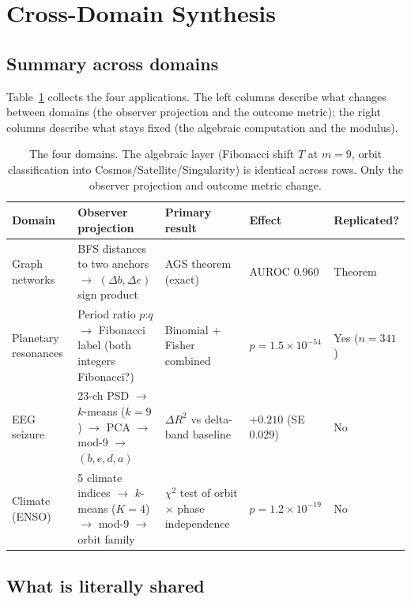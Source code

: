\documentclass[11pt]{article}
\begin{document}
\section{Cross-Domain Synthesis}\label{sec:synthesis}

\subsection{Summary across domains}

Table~\ref{tab:domains} collects the four applications.
The left columns describe what changes between domains (the observer projection
and the outcome metric); the right columns describe what stays fixed
(the algebraic computation and the modulus).

\begin{table}[h]
\centering
\small
\begin{tabular}{p{2cm}p{3.2cm}p{2.5cm}p{2cm}l}
\toprule
\textbf{Domain} & \textbf{Observer projection} & \textbf{Primary result} & \textbf{Effect} & \textbf{Replicated?} \\
\midrule
Graph networks &
  BFS distances to two anchors $\to$ $(\Delta b, \Delta e)$ sign product &
  AGS theorem (exact) &
  AUROC $0.960$ &
  Theorem \\[4pt]
Planetary resonances &
  Period ratio $p$:$q$ $\to$ Fibonacci label (both integers Fibonacci?) &
  Binomial + Fisher combined &
  $p = 1.5\!\times\!10^{-54}$ &
  Yes ($n=341$) \\[4pt]
EEG seizure &
  23-ch PSD $\to$ $k$-means ($k=9$) $\to$ PCA $\to$ mod-9 $\to$ $(b,e,d,a)$ &
  $\Delta R^2$ vs delta-band baseline &
  $+0.210$ (SE $0.029$) &
  No \\[4pt]
Climate (ENSO) &
  5 climate indices $\to$ $k$-means ($K=4$) $\to$ mod-9 $\to$ orbit family &
  $\chi^2$ test of orbit $\times$ phase independence &
  $p = 1.2\!\times\!10^{-19}$ &
  No \\
\bottomrule
\end{tabular}
\caption{The four domains.  The algebraic layer (Fibonacci shift $T$ at $m=9$,
orbit classification into Cosmos/Satellite/Singularity) is identical across rows.
Only the observer projection and outcome metric change.}
\label{tab:domains}
\end{table}

\subsection{What is literally shared}
\end{document}
